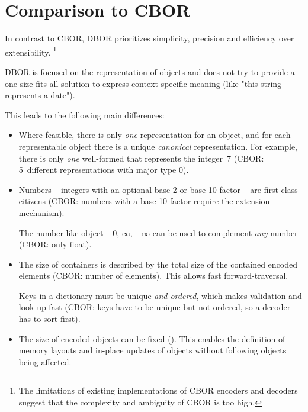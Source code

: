 
\section{Comparison to CBOR}
\label{sec:comparisontocbor}

In contrast to CBOR, DBOR prioritizes simplicity, precision and efficiency over extensibility.%
\footnote{%
    The limitations of existing implementations of CBOR encoders and decoders suggest
    that the complexity and ambiguity of CBOR is too high.
}

DBOR is focused on the representation of objects and does not try to provide a one-size-fits-all solution
to express context-specific meaning (like "this string represents a date").

\medskip
\begin{BeginParPenalty}
    This leads to the following main differences:
    \begin{itemize}
        \item
        Where feasible, there is only \emph{one} representation for an object,
        and for each representable object there is a unique \emph{canonical} representation.
        For example, there is only \emph{one} well-formed \DborIntegerValue{} that represents the integer~$7$
        (CBOR: 5~different representations with major type 0).

        \item
        Numbers -- integers with an optional base-2 or base-10 factor -- are first-class citizens
        (CBOR: numbers with a base-10 factor require the extension mechanism).

        The number-like object $-0$, $\infty$, $-\infty$ can be used to complement \emph{any} number
        (CBOR: only float).

        \item
        The size of containers is described by the total size of the contained encoded elements
        (CBOR: number of elements). This allows fast forward-traversal.

        Keys in a dictionary must be unique \emph{and ordered}, which makes validation and look-up fast
        (CBOR: keys have to be unique but not ordered, so a decoder has to sort first).

        \item
        The size of encoded objects can be fixed (\DborAllocatorValue).
        This enables the definition of memory layouts and in-place updates of objects without
        following objects being affected.
    \end{itemize}
\end{BeginParPenalty}

